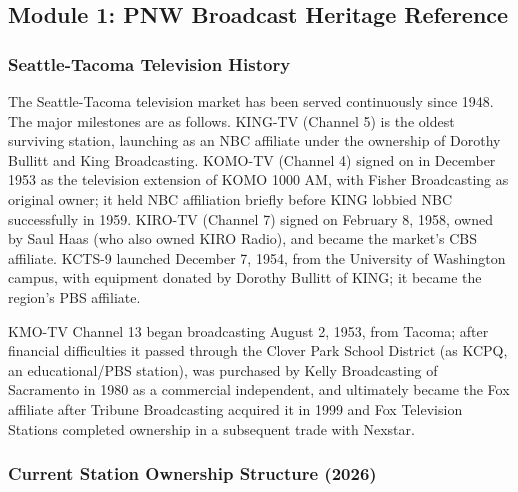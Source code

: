 \documentclass[11pt,letterpaper]{article}
\begin{document}
\subsection{Module 1: PNW Broadcast Heritage Reference}

\subsubsection{Seattle-Tacoma Television History}

The Seattle-Tacoma television market has been served continuously since 1948. The major milestones are as follows. KING-TV (Channel 5) is the oldest surviving station, launching as an NBC affiliate under the ownership of Dorothy Bullitt and King Broadcasting. KOMO-TV (Channel 4) signed on in December 1953 as the television extension of KOMO 1000 AM, with Fisher Broadcasting as original owner; it held NBC affiliation briefly before KING lobbied NBC successfully in 1959. KIRO-TV (Channel 7) signed on February 8, 1958, owned by Saul Haas (who also owned KIRO Radio), and became the market's CBS affiliate. KCTS-9 launched December 7, 1954, from the University of Washington campus, with equipment donated by Dorothy Bullitt of KING; it became the region's PBS affiliate.

KMO-TV Channel 13 began broadcasting August 2, 1953, from Tacoma; after financial difficulties it passed through the Clover Park School District (as KCPQ, an educational/PBS station), was purchased by Kelly Broadcasting of Sacramento in 1980 as a commercial independent, and ultimately became the Fox affiliate after Tribune Broadcasting acquired it in 1999 and Fox Television Stations completed ownership in a subsequent trade with Nexstar.

\subsubsection{Current Station Ownership Structure (2026)}
\end{document}
